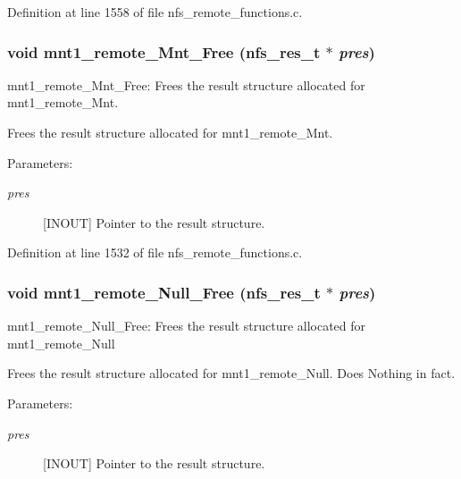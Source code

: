 Definition at line 1558 of file nfs\_\-remote\_\-functions.c.
\subsubsection[{mnt1\_\-remote\_\-Mnt\_\-Free}]{\setlength{\rightskip}{0pt plus 5cm}void mnt1\_\-remote\_\-Mnt\_\-Free (nfs\_\-res\_\-t $\ast$ {\em pres})}\label{group__NFSprocs_g30f7512619321620f25509a49b9cb1df}


mnt1\_\-remote\_\-Mnt\_\-Free: Frees the result structure allocated for mnt1\_\-remote\_\-Mnt.

Frees the result structure allocated for mnt1\_\-remote\_\-Mnt.

\begin{Desc}
\item[Parameters:]
\begin{description}
\item[{\em pres}][INOUT] Pointer to the result structure. \end{description}
\end{Desc}


Definition at line 1532 of file nfs\_\-remote\_\-functions.c.
\subsubsection[{mnt1\_\-remote\_\-Null\_\-Free}]{\setlength{\rightskip}{0pt plus 5cm}void mnt1\_\-remote\_\-Null\_\-Free (nfs\_\-res\_\-t $\ast$ {\em pres})}\label{group__NFSprocs_g32153d3174089abc0a77053fe63a66bb}


mnt1\_\-remote\_\-Null\_\-Free: Frees the result structure allocated for mnt1\_\-remote\_\-Null

Frees the result structure allocated for mnt1\_\-remote\_\-Null. Does Nothing in fact.

\begin{Desc}
\item[Parameters:]
\begin{description}
\item[{\em pres}][INOUT] Pointer to the result structure. \end{description}
\end{Desc}


